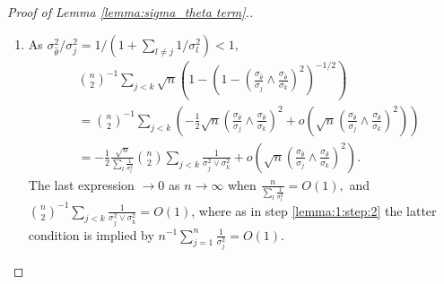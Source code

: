 \documentclass[12pt]{article}
\newcommand{\z}{Z}
\begin{document}
\begin{proof}[Proof of Lemma \ref{lemma:sigma_theta term}.]
\begin{enumerate}[wide, labelwidth=!, labelindent=0pt]
\begin{enumerate}[wide, labelwidth=!, labelindent=0pt]
    As $f_\z\in L^2$, H\"older's inequality implies that $f_{\z-\z'}(z)=(f_\z\star f_{-\z'})(z)$ is uniformly continuous, and therefore $f_U(z)=f_{|\z-\z'|}(z)$ is uniformly continuous, as well. Therefore, given $\epsilon>0$,
    \begin{align}
      \int_0^\infty v f_V(v)\left|f_U\left(rv+\frac{2}{n^a}(r+1)\right) - f_U(rv)\right| dv \le
      \epsilon \int_0^\infty v f_V(v)dv
    \end{align}
    for $n$ large enough, uniformly for all $r$ in a neighborhood of $0$.
  \end{enumerate}
  
    \item\label{lemma:1:step:4} As $\sigma^2_{\hat\theta}/\sigma^2_j=1/(1+\sum_{l\neq j}1/\sigma_l^2)<1,$
    \begin{align}
      &{n\choose 2}^{-1}\sum_{j<k}\sqrt{n}\left(1-\left(1-\left(\frac{\sigma_{\hat\theta}}{\sigma_j}\wedge\frac{\sigma_{\hat\theta}}{\sigma_k}\right)^2\right)^{-1/2}\right) \\
      &= {n\choose 2}^{-1}\sum_{j<k}\left(-\frac{1}{2}\sqrt{n}\left(\frac{\sigma_{\hat\theta}}{\sigma_j}\wedge\frac{\sigma_{\hat\theta}}{\sigma_k}\right)^2
        +o\left(\sqrt{n}\left(\frac{\sigma_{\hat\theta}}{\sigma_j}\wedge\frac{\sigma_{\hat\theta}}{\sigma_k}\right)^2\right)\right)\\
      &=-\frac{1}{2}\frac{\sqrt{n}}{\sum_l\frac{1}{\sigma_l^2}}{n\choose 2}\sum_{j<k}\frac{1}{\sigma_j^2\vee\sigma_k^2} 
        +o\left(\sqrt{n}\left(\frac{\sigma_{\hat\theta}}{\sigma_j}\wedge\frac{\sigma_{\hat\theta}}{\sigma_k}\right)^2\right).
    \end{align}
    The last expression $\to 0$ as $n\to\infty$ when  $\frac{n}{\sum_l\frac{1}{\sigma_l^2}}=O(1),$ and ${n\choose 2}^{-1}\sum_{j<k}\frac{1}{\sigma_j^2\vee\sigma_k^2}=O(1)$, where as in step \eqref{lemma:1:step:2} the latter condition is implied by $n^{-1}\sum_{j=1}^n\frac{1}{\sigma_j^2}=O(1)$.

    
  \end{enumerate}
\end{proof}
\end{document}
